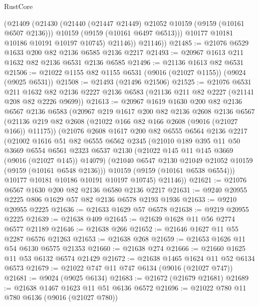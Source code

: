 \begin{lexlean}{RustCore}
\begin{coremodule}
            (@21409
              (@21430
                (@21440 (@21447 @21449) @21052 @10159 (@9159 (@10161 @6507 @2136)))
                @10159
                (@9159 (@10161 @6497 @6513)))
              @10177
              @10181
              @10186
              @10191
              @10197
              @10745)
            @21146))
        @21146))
@21485 := @21076 @6529 @1633 @200 @82 @2136 @6585 @2136 @2217
@21493 := @20967 @1613 @211 @1632 @82 @2136 @6531 @2136 @6585
@21496 := @21136 @1613 @82 @6531
@21506 := @21022 @1155 @82 @1155 @6531 (@9016 (@21027 @1155)) (@9024 (@9025 @6531))
@21508 := @21493 (@21496 @21506)
@21525 := @21076
    @6531
    @211
    @1632
    @82
    @2136
    @2227
    @2136
    @6583
    (@21136 @211 @82 @2227 (@21141 @208 @82 @2226 @9699))
@21613 := @20967
    @1619
    @1630
    @200
    @82
    @2136
    @6567
    @2136
    @6583
    (@20967
      @219
      @1617
      @200
      @82
      @2136
      @2608
      @2136
      @6567
      (@21136 @219 @82 @2608 (@21022 @166 @82 @166 @2608 (@9016 (@21027 @166)) @11175))
      (@21076
        @2608
        @1617
        @200
        @82
        @6555
        @6564
        @2136
        @2217
        (@21002
          @1616
          @51
          @82
          @6555
          @6562
          @2345
          (@21010
            @189
            @395
            @11
            @50
            @3669
            @6554
            @6561
            @2323
            @6537
            @2130
            (@21022 @145 @11 @145 @3669 (@9016 (@21027 @145)) @14079)
            (@21040 @6547 @2130 @21049 @21052 @10159 (@9159 (@10161 @6548 @2136)))
            @10159
            (@9159 (@10161 @6538 @6554)))
          @10177
          @10181
          @10186
          @10191
          @10197
          @10745)
        @21146))
@21621 := @21076 @6567 @1630 @200 @82 @2136 @6580 @2136 @2217
@21631 := @9240 @20955 @2225 @806 @1629 @57 @82 @2136 @6578 @2193 @1936
@21633 := @9210 @20955 @2225
@21636 := @21633 @1629 @57 @6578
@21638 := @9219 @20955 @2225
@21639 := @21638 @409
@21645 := @21639 @1628 @11 @56 @2774 @6577 @21189
@21646 := @21638 @266
@21652 := @21646 @1627 @11 @55 @2287 @6576 @21263
@21653 := @21638 @268
@21659 := @21653 @1626 @11 @54 @6130 @6575 @21353
@21660 := @21638 @274
@21666 := @21660 @1625 @11 @53 @6132 @6574 @21429
@21672 := @21638 @1465 @1624 @11 @52 @6134 @6573
@21679 := @21022 @747 @11 @747 @6134 (@9016 (@21027 @747))
@21681 := @9024 (@9025 @6134)
@21683 := @21672 (@21679 @21681)
@21689 := @21638 @1467 @1623 @11 @51 @6136 @6572
@21696 := @21022 @780 @11 @780 @6136 (@9016 (@21027 @780))

\end{coremodule}
\end{lexlean}
